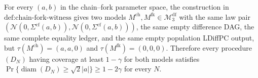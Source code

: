 For every \((a,b)\) in the chain--fork parameter space, the construction in \(\text{def:chain-fork-witness}\) gives two models \(M^{\mathrm{ch}},M^{\mathrm{fk}}\in\mathcal M_3^{\mathrm{df}}\) with the same law pair \((\mathcal N(0,\Sigma^{\mathrm{cf}}(a,b)),\mathcal N(0,\Sigma^{\mathrm{cf}}(a,b)))\), the same empty difference DAG, the same complete equality ledger, and the same empty population LDiffPC output, but \(\tau(M^{\mathrm{ch}})=(a,a,0)\) and \(\tau(M^{\mathrm{fk}})=(0,0,0)\). Therefore every procedure \((D_N)\) having coverage at least \(1-\gamma\) for both models satisfies \(\Pr\{\operatorname{diam}(D_N)\ge\sqrt2|a|\}\ge1-2\gamma\) for every \(N\).